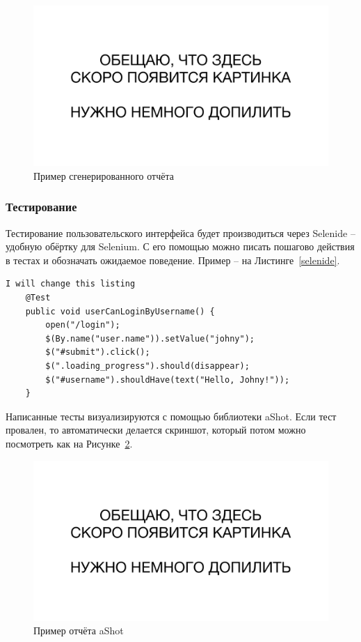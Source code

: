 \documentclass[a4paper,article]{article}
\begin{document}
\begin{sloppypar}
    \begin{figure}[h]
        \centering
        \includegraphics[width=0.8\linewidth]{Сгенерированный отчёт.png}        
        \caption{\centering Пример сгенерированного отчёта}        
        \label{fig:report}
    \end{figure}

    \subsubsection{Тестирование}\label{Реализация. Клиентская часть. Тестирование}
    
    Тестирование пользовательского интерфейса будет производиться через Selenide -- удобную обёртку для Selenium. С его помощью можно писать пошагово действия в тестах и обозначать ожидаемое поведение. Пример -- на Листинге~\ref{selenide}.
    
    \begin{lstlisting}[label=selenide,caption=Пример теста на Selenide]
    I will change this listing
    @Test
    public void userCanLoginByUsername() {
        open("/login");
        $(By.name("user.name")).setValue("johny");
        $("#submit").click();
        $(".loading_progress").should(disappear);
        $("#username").shouldHave(text("Hello, Johny!"));
    }
    \end{lstlisting}
    
    Написанные тесты визуализируются с помощью библиотеки aShot. Если тест провален, то автоматически делается скриншот, который потом можно посмотреть как на Рисунке~\ref{fig:ashot}.
    
    \begin{figure}[h]
        \centering
        \includegraphics[width=0.8\linewidth]{Отчёт aShot.png}        
        \caption{\centering Пример отчёта aShot}        
        \label{fig:ashot}
    \end{figure}
    

\end{sloppypar}
\end{document}
